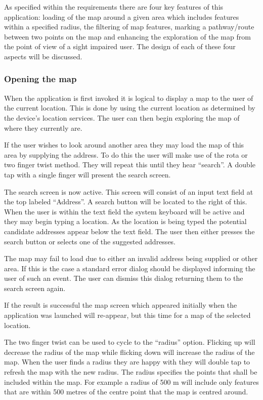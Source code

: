 \documentclass[11pt,twoside,a4paper]{article}
\begin{document}
As specified within the requirements there are four key features of this
application: loading of the map around a given area which includes
features within a specified radius, the filtering of map features,
marking a pathway/route between two points on the map and enhancing the
exploration of the map from the point of view of a sight impaired
user. The design of each of these four aspects will be discussed.

\subsubsection{Opening the map}

When the application is first invoked it is logical to display a map to
the user of the current location. This is done by using the current
location as determined by the device's location services. The user can
then begin exploring the map of where they currently are.

If the user wishes to look around another area they may load the map of
this area by supplying the address. To do this the user will make use of
the rota or two finger twist method. They will repeat this until they
hear ``search''. A double tap with a single finger will present the
search screen.

The search screen is now active. This screen will consist of an input
text field at the top labeled ``Address''. A search button will be
located to the right of this. When the user is within the text field the
system keyboard will be active and they may begin typing a location. As
the location is being typed the potential candidate addresses appear
below the text field. The user then either presses the search button or
selects one of the suggested addresses.

The map may fail to load due to either an invalid address being supplied
or other area. If this is the case a standard error dialog should be
displayed informing the user of such an event. The user can dismiss this
dialog returning them to the search screen again.

If the result is successful the map screen which appeared initially when
the application was launched will re-appear, but this time for a map of
the selected location.

The two finger twist can be used to cycle to the ``radius''
option. Flicking up will decrease the radius of the map while flicking
down will increase the radius of the map. When the user finds a radius
they are happy with they will double tap to refresh the map with the new
radius. The radius specifies the points that shall be included within
the map. For example a radius of 500 m will include only features that
are within 500 metres of the centre point that the map is centred
around.
\end{document}
